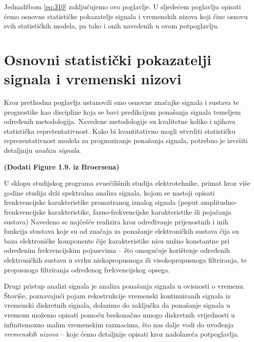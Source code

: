 \documentclass[a4paper,12pt,oneside]{memoir}
\begin{document}
                Jednadžbom \ref{eq:310} zaključujemo ovo poglavlje. U sljedećem poglavlju opisati ćemo osnovne statističke pokazatelje signala i vremenskih nizova koji čine osnovu svih statističkih modela, pa tako i onih navedenih u ovom potpoglavlju.        

    \chapter{Osnovni statistički pokazatelji signala i vremenski nizovi}


        Kroz prethodna poglavlja ustanovili smo osnovne značajke signala i sustava te prognostike kao discipline koja se bavi predikcijom ponašanja signala temeljem određenih metodologija. Navedene metodologije su kvalitetne koliko i njihova statistička repretentativnost. Kako bi kvantitativno mogli utvrditi statističku reprezentativnost modela za prognoziranje ponašanja signala, potrebno je izvršiti detaljniju \textit{analizu signala}.

        \textbf{(Dodati Figure 1.9. iz Broersena)}
        
        U sklopu studijskog programa svuečilišnih studija elektrotehnike, primat kroz više godine studija drži spektralna analiza signala, kojom se nastoji opisati frenkvencijske karakteristike promatranog iznalog signala (poput amplitudno-frenkvencijske karakteristike, fazno-frekvencijske karakteristike ili pojačanja sustava) Navedeno se najčešće realizira kroz određivanje prijenostnih i inih funkcija stustava koje su od značaja za ponašanje elektroničkih sustava čija su baza elektroničke komponente čije karakteristike nisu nužno konstantne pri određenim frekvencijskim pojasevima -- što omogućuje korištenje određenih elektroničkih sustava u svrhu niskopropusnoga ili visokopropusnoga filtriranja, te propusnoga filtriranja određenog frekvencijskog opsega.

        
        Drugi pristup analizi signala je analiza ponašanja signala u ovisnosti o vremenu. Štoviše, poznavajući pojam rekostrukcije vremenski kontinuiranih signala iz vremenski diskretnih signala, dolazimo do zaključka da ponašanje signala u vremenu možemo opisati pomoću beskonačno mnogo diskretnih vrijednosti u infinitemozno malim vremenskim razmacima, što nas dalje vodi do uvođenja \textit{vremenskih nizova} -- koje ćemo detaljnije opisati kroz nadolazeća potpoglavlja.
\end{document}
